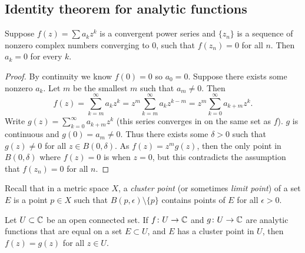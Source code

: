 \subsection{Identity theorem for analytic functions}

\begin{lemma}
Suppose $f(z) = \sum a_k z^k$ is a convergent power series and
$\{ z_n \}$ is a sequence of nonzero complex numbers converging to 0,
such that $f(z_n) = 0$ for all $n$.  Then $a_k = 0$ for every $k$.
\end{lemma}

\begin{proof}
By continuity we know $f(0) = 0$ so $a_0 = 0$.
Suppose there exists some nonzero $a_k$.
Let $m$ be the smallest $m$ such that $a_m \not= 0$.  Then
\begin{equation*}
f(z) = \sum_{k=m}^\infty a_k z^k = 
z^m \sum_{k=m}^\infty a_k z^{k-m} =
z^m \sum_{k=0}^\infty a_{k+m} z^{k} .
\end{equation*}
Write $g(z) = \sum_{k=0}^\infty a_{k+m} z^{k}$ (this series converges in
on the same set as $f$).  $g$ is continuous and $g(0) = a_m \not= 0$.  Thus
there exists some $\delta > 0$ such that $g(z) \not= 0$ for all $z \in
B(0,\delta)$.  As $f(z) = z^m g(z)$, then the only point in $B(0,\delta)$ where
$f(z) = 0$ is when $z=0$, but this contradicts the assumption
that $f(z_n) = 0$ for all $n$.
\end{proof}

Recall that in a metric space $X$, a \emph{cluster point}
(or sometimes \emph{limit point}) of a set
$E$ is a point $p \in X$ such that
$B(p,\epsilon) \setminus \{ p \}$ contains points of $E$
for all $\epsilon > 0$.

\begin{thm}
Let $U \subset {\mathbb{C}}$ be an open connected set.  If $f \colon U \to {\mathbb{C}}$
and $g \colon U \to {\mathbb{C}}$ are analytic functions that are
equal on a set $E \subset U$, and $E$ has a cluster point
in $U$, then $f(z) = g(z)$ for all $z \in U$.
\end{thm}


